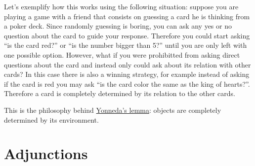 \documentclass[../../main]{subfiles}
\begin{document}
Let's exemplify how this works using the following situation: suppose you are playing a game with a friend that consists on guessing a card he is thinking from a poker deck.
Since randomly guessing is boring, you can ask any yes or no question about the card to guide your response.
Therefore you could start asking ``is the card red?'' or ``is the number bigger than 5?'' until you are only left with one possible option.
However, what if you were prohibitted from asking direct questions about the card and instead only could ask about its relation with other cards?
In this case there is also a winning strategy, for example instead of asking if the card is red you may ask ``is the card color the same as the king of hearts?''.
Therefore a card is completely determined by its relation to the other cards.

This is the philosophy behind \hyperref[thm:yoneda-lemma]{Yonneda's lemma}: objects are completely determined by its environment.


\section{Adjunctions}
\end{document}
